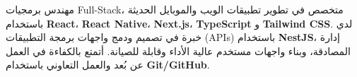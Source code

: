\begin{cvparagraph}
\begin{Arabic}

مهندس برمجيات \textenglish{Full-Stack}، متخصص في تطوير تطبيقات الويب والموبايل الحديثة باستخدام \textenglish{\textbf{React}}، \textenglish{\textbf{React Native}}، \textenglish{\textbf{Next.js}}، \textenglish{\textbf{TypeScript}} و \textenglish{\textbf{Tailwind CSS}}.
لدي خبرة في تصميم ودمج واجهات برمجة التطبيقات (\textenglish{APIs}) باستخدام \textenglish{\textbf{NestJS}}، إدارة المصادقة، وبناء واجهات مستخدم عالية الأداء وقابلة للصيانة.
أتمتع بالكفاءة في العمل عن بُعد والعمل التعاوني باستخدام \textenglish{\textbf{Git/GitHub}}.
\end{Arabic}
\end{cvparagraph}
